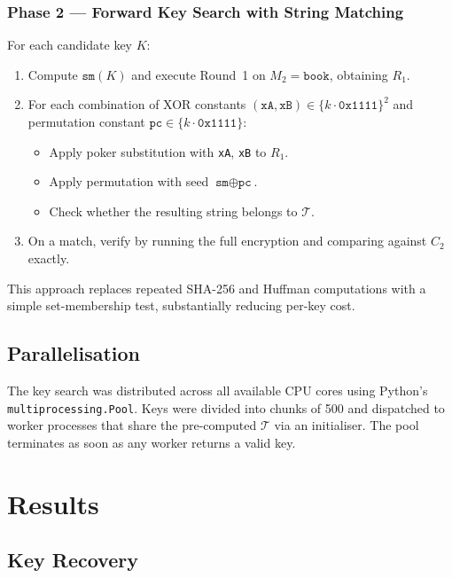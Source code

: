 \documentclass[12pt,a4paper]{article}
\begin{document}
\subsubsection*{Phase 2 — Forward Key Search with String Matching}

For each candidate key $K$:
\begin{enumerate}[noitemsep]
    \item Compute $\texttt{sm}(K)$ and execute Round~1 on $M_2 = \texttt{book}$, obtaining $R_1$.
    \item For each combination of XOR constants $(\texttt{xA}, \texttt{xB}) \in \{k \cdot \texttt{0x1111}\}^2$ and permutation constant $\texttt{pc} \in \{k \cdot \texttt{0x1111}\}$:
        \begin{itemize}[noitemsep]
            \item Apply poker substitution with \texttt{xA}, \texttt{xB} to $R_1$.
            \item Apply permutation with seed $\texttt{sm} \oplus \texttt{pc}$.
            \item Check whether the resulting string belongs to $\mathcal{T}$.
        \end{itemize}
    \item On a match, verify by running the full encryption and comparing against $C_2$ exactly.
\end{enumerate}

This approach replaces repeated SHA-256 and Huffman computations with a simple set-membership test, substantially reducing per-key cost.

\subsection{Parallelisation}

The key search was distributed across all available CPU cores using Python's \texttt{multiprocessing.Pool}. Keys were divided into chunks of 500 and dispatched to worker processes that share the pre-computed $\mathcal{T}$ via an initialiser. The pool terminates as soon as any worker returns a valid key.

\section{Results}

\subsection{Key Recovery}
\end{document}
